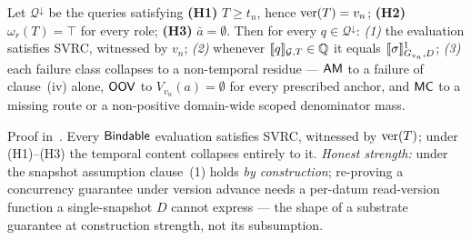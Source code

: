\begin{theorem}[degeneration]
\label{thm:degen}
 Let $\mathcal{Q}^{\downarrow}$ be the queries satisfying \textbf{(H1)}
$T\ge t_n$, hence $\mathrm{ver}(T)=v_n$; \textbf{(H2)} $\omega_r(T)=\top$ for every
role; \textbf{(H3)} $\bar a=\emptyset$. Then for every
$q\in\mathcal{Q}^{\downarrow}$: \emph{(1)} the evaluation satisfies SVRC,
witnessed by $v_n$; \emph{(2)} whenever $[\![q]\!]_{\mathcal{G},T}\in\mathbb{Q}$ it equals
$[\![\sigma]\!]^1_{G_{v_n},D}$; \emph{(3)} each failure class collapses to a
non-temporal residue --- $\mathsf{AM}$ to a failure of clause~(iv) alone, $\mathsf{OOV}$ to
$V_{v_n}(a)=\emptyset$ for every prescribed anchor, and $\mathsf{MC}$ to a missing route
or a non-positive domain-wide scoped denominator mass.
\end{theorem}

\noindent{} Proof in~\cite{asofgov-tr}. Every $\mathsf{Bindable}$ evaluation satisfies
SVRC, witnessed by $\mathrm{ver}(T)$; under (H1)--(H3) the temporal content collapses
entirely to it. \emph{Honest strength:} under the snapshot assumption clause~(1) holds \emph{by
construction}; re-proving a concurrency guarantee under version advance needs
a per-datum read-version function a single-snapshot $D$ cannot express --- the
shape of a substrate guarantee at construction strength, not its
subsumption.
